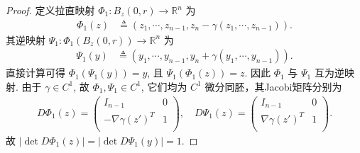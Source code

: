 \documentclass[../../main.tex]{subfiles}%
\begin{document}
\begin{proof}
定义拉直映射 \(\Phi_1: B_z(0, r) \to \mathbb{R}^n\) 为
\begin{align*}
\Phi_1(z) &\triangleq (z_1, \cdots, z_{n-1}, z_n - \gamma(z_1, \cdots, z_{n-1})).
\end{align*}
其逆映射 \(\Psi_1: \Phi_1(B_z(0, r)) \to \mathbb{R}^n\) 为
\begin{align*}
\Psi_1(y) &\triangleq (y_1, \cdots, y_{n-1}, y_n + \gamma(y_1, \cdots, y_{n-1})).
\end{align*}
直接计算可得 \(\Phi_1(\Psi_1(y)) = y\), 且 \(\Psi_1(\Phi_1(z)) = z\). 因此 \(\Phi_1\) 与 \(\Psi_1\) 互为逆映射. 由于 \(\gamma \in C^1\), 故 \(\Phi_1, \Psi_1 \in C^1\), 它们均为 \(C^1\) 微分同胚，其Jacobi矩阵分别为
\begin{align*}
D\Phi _1\left( z \right) =\left( \begin{matrix}
I_{n-1}&		0\\
-\nabla \gamma \left( z' \right) ^T&		1\\
\end{matrix} \right) ,\quad D\Psi _1\left( z \right) =\left( \begin{matrix}
I_{n-1}&		0\\
\nabla \gamma \left( z' \right) ^T&		1\\
\end{matrix} \right) .
\end{align*}
故 \(\left| \det D\Phi _1(z) \right|=\left| \det D\Psi _1(y) \right|=1\).


\end{proof}
\end{document}
